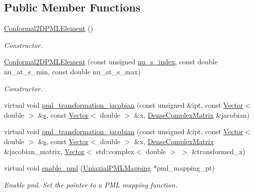 \subsection*{Public Member Functions}
\begin{DoxyCompactItemize}
\item 
\hyperlink{classoomph_1_1Conformal2DPMLElement_a6279ae664761a04681287176cc0ae9d4}{Conformal2\+D\+P\+M\+L\+Element} ()
\begin{DoxyCompactList}\small\item\em Constructor. \end{DoxyCompactList}\item 
\hyperlink{classoomph_1_1Conformal2DPMLElement_a90de10011a8fb7062707d5c028a22d50}{Conformal2\+D\+P\+M\+L\+Element} (const unsigned \hyperlink{classoomph_1_1Conformal2DPMLElement_ac0fae35f94a70e615a8bbd47716a32d3}{nu\+\_\+s\+\_\+index}, const double nu\+\_\+at\+\_\+s\+\_\+min, const double nu\+\_\+at\+\_\+s\+\_\+max)
\begin{DoxyCompactList}\small\item\em Constructor. \end{DoxyCompactList}\item 
virtual void \hyperlink{classoomph_1_1Conformal2DPMLElement_ae30e06af48dbb74be0fc64173c8fbb63}{pml\+\_\+transformation\+\_\+jacobian} (const unsigned \&ipt, const \hyperlink{classoomph_1_1Vector}{Vector}$<$ double $>$ \&\hyperlink{cfortran_8h_ab7123126e4885ef647dd9c6e3807a21c}{s}, const \hyperlink{classoomph_1_1Vector}{Vector}$<$ double $>$ \&x, \hyperlink{classoomph_1_1DenseComplexMatrix}{Dense\+Complex\+Matrix} \&jacobian)
\item 
virtual void \hyperlink{classoomph_1_1Conformal2DPMLElement_a1d352e991b9ad7622c27b82d474b4877}{pml\+\_\+transformation\+\_\+jacobian} (const unsigned \&ipt, const \hyperlink{classoomph_1_1Vector}{Vector}$<$ double $>$ \&\hyperlink{cfortran_8h_ab7123126e4885ef647dd9c6e3807a21c}{s}, const \hyperlink{classoomph_1_1Vector}{Vector}$<$ double $>$ \&x, \hyperlink{classoomph_1_1DenseComplexMatrix}{Dense\+Complex\+Matrix} \&jacobian\+\_\+matrix, \hyperlink{classoomph_1_1Vector}{Vector}$<$ std\+::complex$<$ double $>$ $>$ \&transformed\+\_\+x)
\item 
virtual void \hyperlink{classoomph_1_1Conformal2DPMLElement_a8ac82beb6f246e627340df19ecd8c078}{enable\+\_\+pml} (\hyperlink{classoomph_1_1UniaxialPMLMapping}{Uniaxial\+P\+M\+L\+Mapping} $\ast$pml\+\_\+mapping\+\_\+pt)
\begin{DoxyCompactList}\small\item\em Enable pml. Set the pointer to a P\+ML mapping function. \end{DoxyCompactList}\item 

\end{DoxyCompactItemize}
